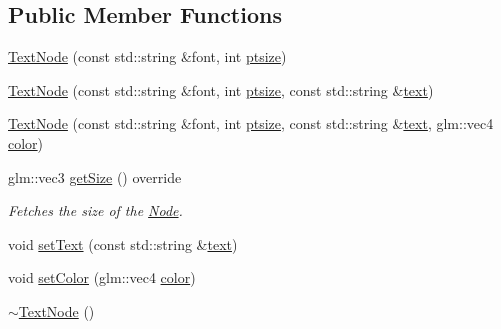 \subsection*{Public Member Functions}
\begin{DoxyCompactItemize}
\item 
\mbox{\hyperlink{classsage_1_1TextNode_a5fbde25db3407b5e5e84ef297821dec6}{Text\+Node}} (const std\+::string \&font, int \mbox{\hyperlink{classsage_1_1TextNode_a1811c136026bea8ba6f27184e2d53c0c}{ptsize}})
\item 
\mbox{\hyperlink{classsage_1_1TextNode_a9988fa03958e378b3fd612ea3a103649}{Text\+Node}} (const std\+::string \&font, int \mbox{\hyperlink{classsage_1_1TextNode_a1811c136026bea8ba6f27184e2d53c0c}{ptsize}}, const std\+::string \&\mbox{\hyperlink{classsage_1_1TextNode_a2828e281a4ea3cce151de7cc983ca2c0}{text}})
\item 
\mbox{\hyperlink{classsage_1_1TextNode_ae437d57affeda55372f70607bc1c1ebf}{Text\+Node}} (const std\+::string \&font, int \mbox{\hyperlink{classsage_1_1TextNode_a1811c136026bea8ba6f27184e2d53c0c}{ptsize}}, const std\+::string \&\mbox{\hyperlink{classsage_1_1TextNode_a2828e281a4ea3cce151de7cc983ca2c0}{text}}, glm\+::vec4 \mbox{\hyperlink{classsage_1_1TextNode_a005f3c7841dc825fb762cb84dc667088}{color}})
\item 
glm\+::vec3 \mbox{\hyperlink{classsage_1_1TextNode_acdfcc350ceb004d934ab731ad9d1e176}{get\+Size}} () override
\begin{DoxyCompactList}\small\item\em Fetches the size of the \mbox{\hyperlink{classsage_1_1Node}{Node}}. \end{DoxyCompactList}\item 
void \mbox{\hyperlink{classsage_1_1TextNode_a81f9aa6c3c25d5b2b53904becad654fe}{set\+Text}} (const std\+::string \&\mbox{\hyperlink{classsage_1_1TextNode_a2828e281a4ea3cce151de7cc983ca2c0}{text}})
\item 
void \mbox{\hyperlink{classsage_1_1TextNode_ab08e5884c5a182320d80e53e700e4a5d}{set\+Color}} (glm\+::vec4 \mbox{\hyperlink{classsage_1_1TextNode_a005f3c7841dc825fb762cb84dc667088}{color}})
\item 
\mbox{\hyperlink{classsage_1_1TextNode_a3ad8241316536959f2727a0abb8dc3e7}{$\sim$\+Text\+Node}} ()
\end{DoxyCompactItemize}
